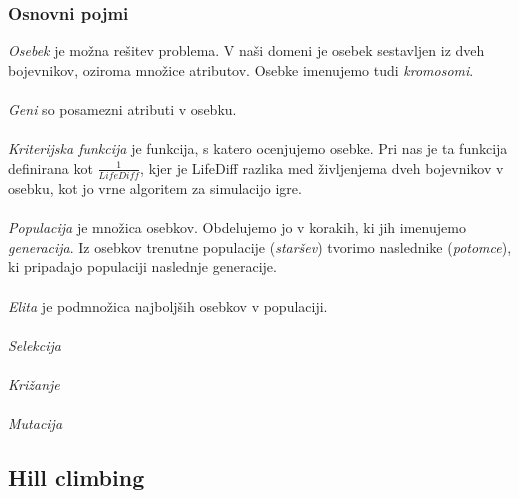 \documentclass[12pt,a4paper,openany]{book}
\begin{document}
\subsubsection{Osnovni pojmi}
\textit{Osebek} je možna rešitev problema. V naši domeni je osebek sestavljen iz dveh bojevnikov, oziroma množice atributov. Osebke imenujemo tudi \textit{kromosomi}.
\\\\
\textit{Geni} so posamezni atributi v osebku.
\\\\
\textit{Kriterijska funkcija} je funkcija, s katero ocenjujemo osebke. Pri nas je ta funkcija definirana kot $\frac{1}{LifeDiff}$, kjer je LifeDiff razlika med življenjema dveh bojevnikov v osebku, kot jo vrne algoritem za simulacijo igre.
\\\\
\textit{Populacija} je množica osebkov. Obdelujemo jo v korakih, ki jih imenujemo \textit{generacija}. Iz osebkov trenutne populacije (\textit{staršev}) tvorimo naslednike (\textit{potomce}), ki pripadajo populaciji naslednje generacije.
\\\\
\textit{Elita} je podmnožica najboljših osebkov v populaciji.
\\\\
\textit{Selekcija}
\\\\
\textit{Križanje}
\\\\
\textit{Mutacija}

\subsection{Hill climbing}



\newpage



\listoffigures

\listoftables

\newpage
\end{document}
